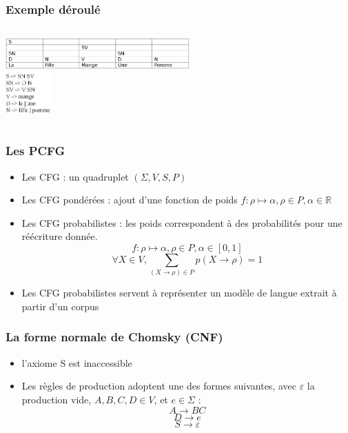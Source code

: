 \documentclass[table]{beamer}
\begin{document}
\begin{frame}
\frametitle{Exemple déroulé}
  \begin{columns}
  \begin{column}{0.6\textwidth}
     \includegraphics[width=200pt,]{10.jpeg}  \\
  \includegraphics[width=50pt,]{11.jpeg}  
  \end{column}
  \end{columns}
\end{frame}


\begin{frame}
 \frametitle{Les PCFG}
 \begin{itemize}
  \item<1-4>{Les CFG : un quadruplet $(\Sigma,V,S,P)$ }
  \item<2-4>{Les CFG pondérées : ajout d'une fonction de poids $ f : \rho \mapsto \alpha, \rho \in P, \alpha \in \mathbb{R} $ }
  \item<3-4>{Les CFG probabilistes : les poids correspondent à des probabilités pour une réécriture donnée.  
  $$ f : \rho \mapsto \alpha, \rho \in P, \alpha \in [0,1]$$ $$ \forall X \in V, \sum_{(X\to \rho ) \in P }p(X \to \rho)=1 $$ }
  \item<4>{Les CFG probabilistes servent à représenter un modèle de langue extrait à partir d'un corpus }
 \end{itemize}

\end{frame}



\begin{frame} 
\frametitle{La forme normale de Chomsky (CNF)}
 \begin{itemize}
 \item {l'axiome S est inaccessible}
 \item {Les règles de production adoptent une des formes suivantes, avec  $\varepsilon$ la production vide, $A,B,C,D \in V$, et $e \in \Sigma$ : 
     $$A \rightarrow B C $$ 
     $$ D \rightarrow e $$
     $$ S \rightarrow \varepsilon$$ }

 \end{itemize}

\end{frame}
\end{document}
